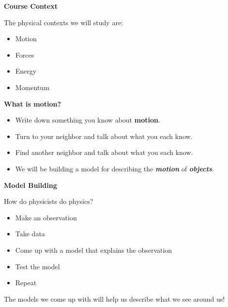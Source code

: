\documentclass[]{article}
\begin{document}
\newpage
\begin{TeacherMargin}

\end{TeacherMargin}
\begin{PresentSpace}
\begin{center}
	\textbf{Course Context}
\end{center}
The physical contexts we will study are:
\begin{itemize}
	\item Motion
	\item Forces
	\item Energy
	\item Momentum
\end{itemize}
\vspace{3cm}
\begin{center}
	\textbf{What is motion?}
\end{center}
\begin{itemize}
	\item Write down something you know about \textbf{motion}.
	\item Turn to your neighbor and talk about what you each know.
	\item Find another neighbor and talk about what you each know.
	\item We will be building a model for describing the \textit{\textbf{motion}} of \textit{\textbf{objects}}.
\end{itemize}
\end{PresentSpace}
\newpage
\begin{TeacherMargin}

\end{TeacherMargin}
\begin{PresentSpace}
\begin{center}
	\textbf{Model Building}
\end{center}
How do physicists do physics?
\begin{itemize}
	\item Make an observation
	\item Take data
	\item Come up with a model that explains the observation
	\item Test the model
	\item Repeat
\end{itemize}
The models we come up with will help us describe what we see around us!
\end{PresentSpace}
\newpage
\end{document}
